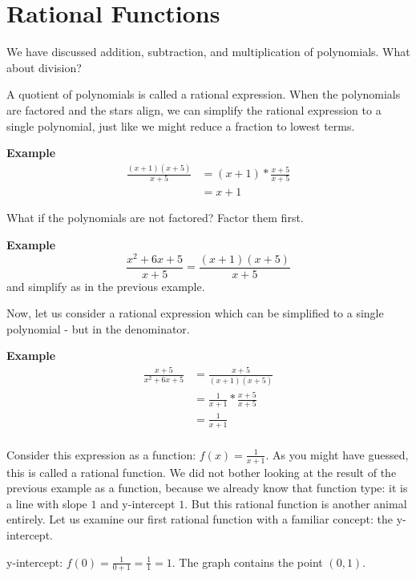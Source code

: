 \chapter{Rational Functions}

We have discussed addition, subtraction, and multiplication of polynomials. What about division?

A quotient of polynomials is called a rational expression. When the polynomials are factored and the stars align, we can simplify the rational expression to a single polynomial, just like we might reduce a fraction to lowest terms.

\textbf{Example} 
\begin{equation} \label{eq1}
\begin{split}
\frac{(x + 1)(x + 5)}{x + 5} & = (x + 1) * \frac{x+5}{x+5} \\
& = x + 1
\end{split}
\end{equation}

What if the polynomials are not factored? Factor them first.

\textbf{Example} 
\[ \frac{x^2 + 6x + 5}{x + 5} = \frac{(x + 1)(x + 5)}{x + 5} \]
and simplify as in the previous example.

Now, let us consider a rational expression which can be simplified to a single polynomial - but in the denominator.

\textbf{Example}
\begin{equation} \label{eq1}
\begin{split}
\frac{x + 5}{x^2 + 6x + 5} & = \frac{x + 5}{(x + 1)(x + 5)} \\
& = \frac{1}{x+1} * \frac{x+5}{x+5} \\
& = \frac{1}{x+1} \\
\end{split}
\end{equation}

Consider this expression as a function: \( f(x) = \frac{1}{x+1} \). As you might have guessed, this is called a rational function. We did not bother looking at the result of the previous example as a function, because we already know that function type: it is a line with slope \( 1 \) and y-intercept \( 1 \). But this rational function is another animal entirely. Let us examine our first rational function with a familiar concept: the y-intercept. 

y-intercept: \( f(0) = \frac{1}{0 + 1} = \frac{1}{1} = 1 \). The graph contains the point \( (0, 1) \).

